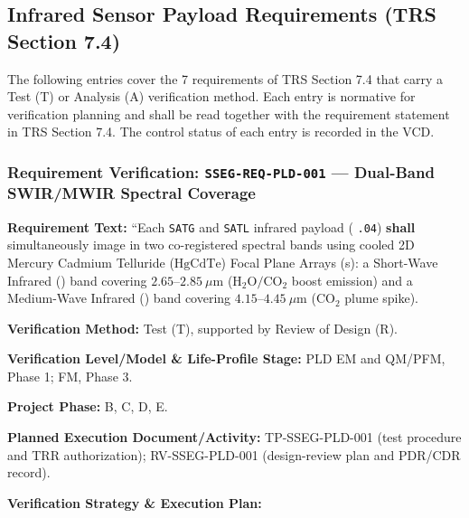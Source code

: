 \subsection{Infrared Sensor Payload Requirements (TRS Section 7.4)}
The following entries cover the 7 requirements of TRS Section 7.4 that carry a Test (T) or Analysis (A) verification method. Each entry is normative for verification planning and shall be read together with the requirement statement in TRS Section 7.4. The control status of each entry is recorded in the VCD.
\subsubsection{Requirement Verification: \texttt{SSEG-REQ-PLD-001} --- Dual-Band SWIR/MWIR Spectral Coverage}
\label{ver:SSEG-REQ-PLD-001}
\textbf{Requirement Text:} ``Each \texttt{SATG} and \texttt{SATL} infrared payload ( \texttt{.04}) \textbf{shall} simultaneously image in two co-registered spectral bands using cooled 2D Mercury Cadmium Telluride ($\mathrm{HgCdTe}$) Focal Plane Arrays (s): a Short-Wave Infrared () band covering $2.65\text{--}2.85~\mu\mathrm{m}$ ($\mathrm{H_2O}/\mathrm{CO_2}$ boost emission) and a Medium-Wave Infrared () band covering $4.15\text{--}4.45~\mu\mathrm{m}$ ($\mathrm{CO_2}$ plume spike).
\par\textbf{Verification Method:} Test (T), supported by Review of Design (R).
\par\textbf{Verification Level/Model \& Life-Profile Stage:} PLD EM and QM/PFM, Phase 1; FM, Phase 3.
\par\textbf{Project Phase:} B, C, D, E.
\par\textbf{Planned Execution Document/Activity:} TP-SSEG-PLD-001 (test procedure and TRR authorization); RV-SSEG-PLD-001 (design-review plan and PDR/CDR record).
\par\textbf{Verification Strategy \& Execution Plan:}
